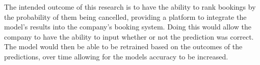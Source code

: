 \vspace{5mm}

The intended outcome of this research is to have the ability to rank bookings by the probability of them being cancelled, providing a platform to integrate the model's results into the company's booking system. Doing this would allow the company to have the ability to input whether or not the prediction was correct. The model would then be able to be retrained based on the outcomes of the predictions, over time allowing for the models accuracy to be increased. 